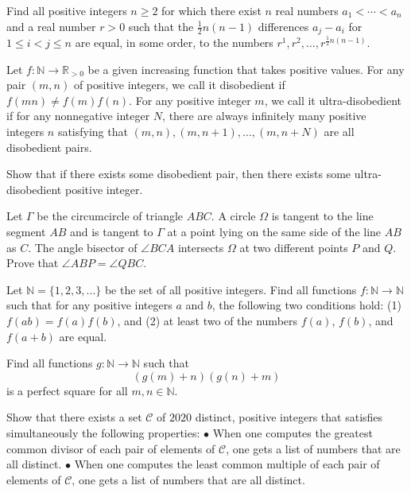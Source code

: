 \documentclass[11pt]{scrartcl}
\begin{document}
\begin{problem}[596902679696332]
Find all positive integers $n \geqslant 2$ for which there exist $n$ real numbers $a_1<\cdots< a_n$ and a real number $r>0$ such that the $\tfrac{1}{2}n(n-1)$ differences $a_j-a_i$ for $1 \leqslant i<j \leqslant n$ are equal, in some order, to the numbers $r^1,r^2,\ldots,r^{\frac{1}{2}n(n-1)}$.
\end{problem}
\begin{problem}[4829488265746237263]
Let $f:\mathbb{N}\to\mathbb{R}_{>0}$ be a given increasing function that takes positive values. For any pair $(m,n)$ of positive integers, we call it disobedient if $f(mn)\neq f(m)f(n)$. For any positive integer $m$, we call it ultra-disobedient if for any nonnegative integer $N$, there are always infinitely many positive integers $n$ satisfying that $(m,n), (m,n+1),\ldots,(m,n+N)$ are all disobedient pairs.

Show that if there exists some disobedient pair, then there exists some ultra-disobedient positive integer.
\end{problem}
\begin{problem}[699399831701585]
Let $\Gamma $ be the circumcircle of triangle $ABC$. A circle $\Omega$ is tangent to the line segment $AB$ and is tangent to $\Gamma$ at a point lying on the same side of the line $AB$ as $C$. The angle bisector of $\angle BCA$ intersects $\Omega$ at two different points $P$ and $Q$.
Prove that $\angle ABP = \angle QBC$.
\end{problem}
\begin{problem}[162858780891462]
Let $\mathbb{N}=\{1, 2, 3, \dots\}$ be the set of all positive integers. Find all functions $f : \mathbb{N} \rightarrow \mathbb{N}$ such that for any positive integers $a$ and $b$, the following two conditions hold:
(1) $f(ab) = f(a)f(b)$, and
(2) at least two of the numbers $f(a)$, $f(b)$, and $f(a+b)$ are equal.
\end{problem}
\begin{problem}[192311188438770]
Find all functions $g:\mathbb{N}\rightarrow\mathbb{N}$ such that\[\left(g(m)+n\right)\left(g(n)+m\right)\]is a perfect square for all $m,n\in\mathbb{N}.$
\end{problem}
\begin{problem}[5392114638976928066]
	Show that there exists a set $\mathcal{C}$ of $2020$ distinct, positive integers that satisfies simultaneously the following properties:
$\bullet$ When one computes the greatest common divisor of each pair of elements of $\mathcal{C}$, one gets a list of numbers that are all distinct.
$\bullet$ When one computes the least common multiple of each pair of elements of $\mathcal{C}$, one gets a list of numbers that are all distinct.
\end{problem}
\end{document}
